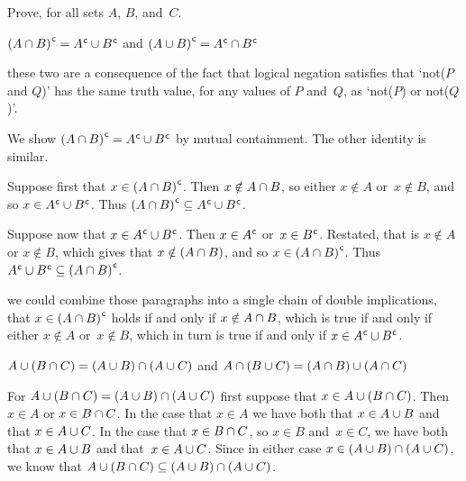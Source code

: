 \documentclass{ibl}  %
\begin{document}
\begin{problem}
  Prove, for all sets $A$, $B$, and~$C$.
\begin{exes}
\begin{exercise} 
  ${(A\cap B)}^{\mspace{1mu}\mathsf{c}}={A}^{\mspace{1mu}\mathsf{c}}\cup{B}^{\mspace{1mu}\mathsf{c}}$
  and
  ${(A\cup B)}^{\mspace{1mu}\mathsf{c}}={A}^{\mspace{1mu}\mathsf{c}}\cap{B}^{\mspace{1mu}\mathsf{c}}$ 
\end{exercise}
\begin{answer}
  \remark these two are a consequence of the fact that logical negation
  satisfies that `not($P$ and $Q$)' has the same truth value, for any
  values of $P$ and~$Q$, as `not($P$) or not($Q$)'.

  We show  ${(A\cap B)}^{\mspace{1mu}\mathsf{c}}={A}^{\mspace{1mu}\mathsf{c}}\cup{B}^{\mspace{1mu}\mathsf{c}}$
  by mutual containment.
  The other identity is similar.  

  Suppose first that $x\in {(A\cap B)}^{\mspace{1mu}\mathsf{c}}$.
  Then $x\notin A\cap B$, so 
  either $x\notin A$ or~$x\notin B$,
  and so $x\in {A}^{\mspace{1mu}\mathsf{c}}\cup{B}^{\mspace{1mu}\mathsf{c}}$.
  Thus ${(A\cap B)}^{\mspace{1mu}\mathsf{c}}\subseteq{A}^{\mspace{1mu}\mathsf{c}}\cup{B}^{\mspace{1mu}\mathsf{c}}$.

  Suppose now that $x\in {A}^{\mspace{1mu}\mathsf{c}}\cup{B}^{\mspace{1mu}\mathsf{c}}$.
  Then $x\in{A}^{\mspace{1mu}\mathsf{c}}$ or~$x\in{B}^{\mspace{1mu}\mathsf{c}}$.
  Restated, that is $x\notin A$ or $x\notin B$,
  which gives that $x\notin (A\cap B)$, and
  so $x\in{(A\cap B)}^{\mspace{1mu}\mathsf{c}}$.
  Thus ${A}^{\mspace{1mu}\mathsf{c}}\cup{B}^{\mspace{1mu}\mathsf{c}}\subseteq{(A\cap B)}^{\mspace{1mu}\mathsf{c}}$.  

  \remark we could combine those paragraphs into a single chain of 
  double implications, that 
  $x\in {(A\cap B)}^{\mspace{1mu}\mathsf{c}}$ holds if and only if
  $x\notin A\cap B$, which is true if and only if 
  either $x\notin A$ or~$x\notin B$,
  which in turn is true if and only if $x\in {A}^{\mspace{1mu}\mathsf{c}}\cup{B}^{\mspace{1mu}\mathsf{c}}$.  
\end{answer}
\begin{exercise}  
  $A\cup (B\cap C)=(A\cup B)\cap (A\cup C)$
  and 
  $A\cap (B\cup C)=(A\cap B)\cup (A\cap C)$
\end{exercise}
\begin{answer}
  For $A\cup (B\cap C)=(A\cup B)\cap (A\cup C)$
  first suppose that $x\in A\cup (B\cap C)$.
  Then $x\in A$ or $x\in B\cap C$.
  In the case that $x\in A$ we have both that $x\in A\cup B$ and that
  $x\in A\cup C$.
  In the case that $x\in B\cap C$, so $x\in B$ and~$x\in C$, 
  we have both that $x\in A\cup B$ and that~$x\in A\cup C$.
  Since in either case $x\in (A\cup B)\cap (A\cup C)$,
  we know that 
  $A\cup (B\cap C)\subseteq (A\cup B)\cap (A\cup C)$.


\end{answer}
\end{exes}
\end{problem}
\end{document}
